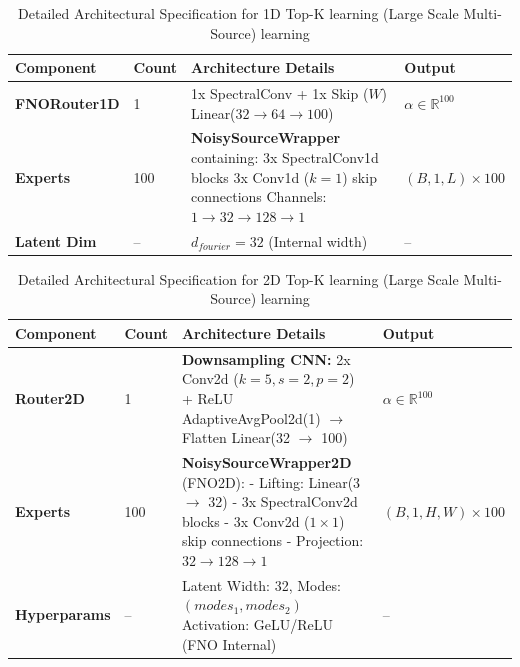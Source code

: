 \documentclass[preprint,12pt,authoryear]{elsarticle}
\begin{document}
\begin{table}[ht]
\centering
\caption{Detailed Architectural Specification for 1D Top-K learning (Large Scale Multi-Source) learning} \label{tab:admm_combiner}
\begin{tabular}{@{}llp{6.5cm}l@{}} %
\toprule
\textbf{Component} & \textbf{Count} & \textbf{Architecture Details} & \textbf{Output} \\ \midrule

\textbf{FNORouter1D} & 1 & 1x SpectralConv + 1x Skip ($W$) \newline 
Linear($32 \to 64 \to 100$) & $\alpha \in \mathbb{R}^{100}$ \\ \addlinespace

\textbf{Experts} & 100 & \textbf{NoisySourceWrapper} containing: \newline 
3x SpectralConv1d blocks \newline 
3x Conv1d ($k=1$) skip connections \newline 
Channels: $1 \to 32 \to 128 \to 1$ & $(B, 1, L) \times 100$ \\ \addlinespace

\textbf{Latent Dim} & -- & $d_{fourier} = 32$ (Internal width) & -- \\ \bottomrule
\end{tabular}
\end{table}



\begin{table}[ht]
\centering
\caption{Detailed Architectural Specification for 2D Top-K learning (Large Scale Multi-Source) learning}
\label{tab:admm_fno_ensemble}
\small
\begin{tabularx}{\textwidth}{@{} ll X l @{}}
\toprule
\textbf{Component} & \textbf{Count} & \textbf{Architecture Details} & \textbf{Output} \\ \midrule

\textbf{Router2D} & 1 & \textbf{Downsampling CNN:} \newline 
2x Conv2d ($k=5, s=2, p=2$) + ReLU \newline 
AdaptiveAvgPool2d(1) $\to$ Flatten \newline 
Linear(32 $\to$ 100) & $\alpha \in \mathbb{R}^{100}$ \\ \addlinespace

\textbf{Experts} & 100 & \textbf{NoisySourceWrapper2D} (FNO2D): \newline
- Lifting: Linear(3 $\to$ 32) \newline
- 3x SpectralConv2d blocks \newline
- 3x Conv2d ($1 \times 1$) skip connections \newline
- Projection: $32 \to 128 \to 1$ & $(B, 1, H, W) \times 100$ \\ \addlinespace

\textbf{Hyperparams} & -- & Latent Width: 32, Modes: $(modes_1, modes_2)$ \newline Activation: GeLU/ReLU (FNO Internal) & -- \\ 
\bottomrule
\end{tabularx}
\end{table}
\end{document}
